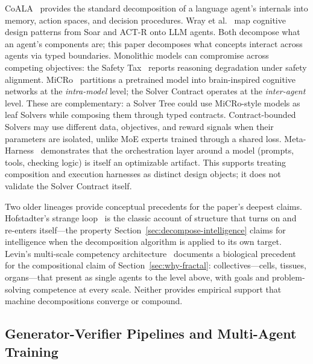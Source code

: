 \documentclass[11pt]{article}
\begin{document}
CoALA~\cite{Sumers2024coala} provides the standard decomposition of a language agent's internals into memory, action spaces, and decision procedures. Wray et al.~\cite{Wray2025cognitive} map cognitive design patterns from Soar and ACT-R onto LLM agents. Both decompose what an agent's components are; this paper decomposes what concepts interact across agents via typed boundaries. Monolithic models can compromise across competing objectives: the Safety Tax~\cite{Huang2025} reports reasoning degradation under safety alignment. MiCRo~\cite{AlKhamissi2025} partitions a pretrained model into brain-inspired cognitive networks at the \emph{intra-model} level; the Solver Contract operates at the \emph{inter-agent} level. These are complementary: a Solver Tree could use MiCRo-style models as leaf Solvers while composing them through typed contracts. Contract-bounded Solvers may use different data, objectives, and reward signals when their parameters are isolated, unlike MoE experts trained through a shared loss. Meta-Harness~\cite{lee2026metaharness} demonstrates that the orchestration layer around a model (prompts, tools, checking logic) is itself an optimizable artifact. This supports treating composition and execution harnesses as distinct design objects; it does not validate the Solver Contract itself.

Two older lineages provide conceptual precedents for the paper's deepest claims. Hofstadter's strange loop~\cite{hofstadter1979geb} is the classic account of structure that turns on and re-enters itself---the property Section~\ref{sec:decompose-intelligence} claims for intelligence when the decomposition algorithm is applied to its own target. Levin's multi-scale competency architecture~\cite{levin2022tame} documents a biological precedent for the compositional claim of Section~\ref{sec:why-fractal}: collectives---cells, tissues, organs---that present as single agents to the level above, with goals and problem-solving competence at every scale. Neither provides empirical support that machine decompositions converge or compound.

\subsection{Generator-Verifier Pipelines and Multi-Agent Training}
\end{document}
